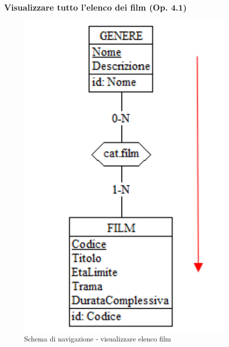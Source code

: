 \documentclass[a4paper,12pt]{report}
\begin{document}
	\subsubsection{Visualizzare tutto l'elenco dei film (Op. 4.1)}
	\begin{figure}[H]
		\centering
		\includegraphics[width=300pt]{ER/navigazione/visualizzarefilm.png}
		\caption{Schema di navigazione - visualizzare elenco film}
	\end{figure}
	
\end{document}
